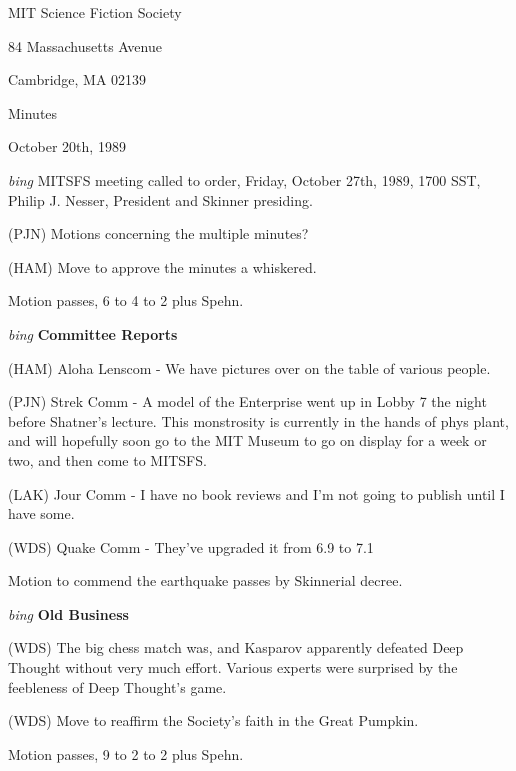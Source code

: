 \setlength{\topmargin}{-0.5in}
\setlength{\oddsidemargin}{-0.60in}
\setlength{\textheight}{9in}
\setlength{\textwidth}{6.5in}



\begin{center}
MIT Science Fiction Society

84 Massachusetts Avenue

Cambridge, MA 02139

\vspace{0.2in}
Minutes

October 20th, 1989

\end{center}
 
\vspace{0.15in}
{\em bing\/} MITSFS meeting called to order, Friday, October 27th, 1989,
1700 SST, Philip J. Nesser, President and Skinner presiding.

(PJN) Motions concerning the multiple minutes?

(HAM) Move to approve the minutes a whiskered.

Motion passes, 6 to 4 to 2 plus Spehn.

\vspace{0.15in}
{\em bing\/} {\bf Committee Reports}

(HAM) Aloha Lenscom - We have pictures over on the table of various people.

(PJN) Strek Comm - A model of the Enterprise went up in Lobby 7 the
night before Shatner's lecture.  This monstrosity is currently in the
hands of phys plant, and will hopefully soon go to the MIT Museum to
go on display for a week or two, and then come to MITSFS.

(LAK) Jour Comm - I have no book reviews and I'm not going to publish
until I have some.

(WDS) Quake Comm - They've upgraded it from 6.9 to 7.1

Motion to commend the earthquake passes by Skinnerial decree.

\vspace{0.15in}
{\em bing\/}  {\bf Old Business}

(WDS) The big chess match was, and Kasparov apparently defeated Deep
Thought without very much effort.  Various experts were surprised by
the feebleness of Deep Thought's game.

(WDS) Move to reaffirm the Society's faith in the Great Pumpkin.

Motion passes, 9 to 2 to 2 plus Spehn.

